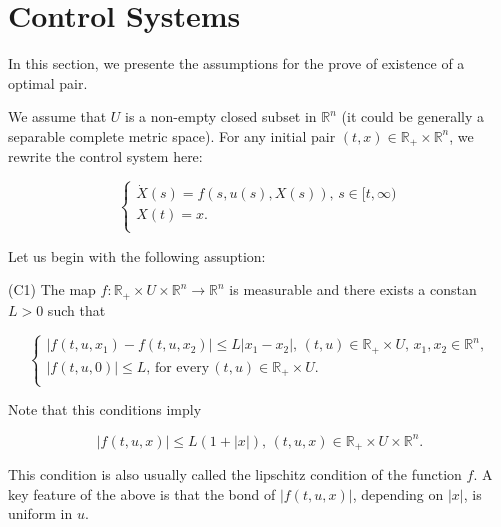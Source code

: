 \section{Control Systems}

In this section, we presente the assumptions for the prove of existence of a 
optimal pair.

We assume that $U$ is a non-empty closed subset in $\mathbb{R}^n$ (it could be 
generally a separable complete metric space). For any initial pair $(t,x)\in 
\mathbb{R}_{+}\times\mathbb{R}^n$, we rewrite the control system here:

\begin{equation}\label{eq2.1}
	\left\{ \begin{array}{l}
	\dot{X}(s)=f(s,u(s),X(s)),\, s\in [t,\infty) \\
	X(t)=x.\\
	\end{array}
	\right.
\end{equation}

Let us begin with the following assuption:

(C1) The map $f:\mathbb{R}_{+}\times U\times \mathbb{R}^n\rightarrow 
\mathbb{R}^n$ is measurable and there exists a constan $L>0$ such that

$$\left\{ \begin{array}{l}
	|f(t,u,x_1)-f(t,u,x_2)|\leq L|x_1-x_2|,\, (t,u)\in \mathbb{R}_{+}\times 
	U,\, x_1,x_2\in \mathbb{R}^n,\\
	|f(t,u,0)|\leq L,\,\mbox{for every}\,(t,u)\in \mathbb{R}_{+}\times U .\\
\end{array}
\right.$$

Note that this conditions imply

$$|f(t,u,x)|\leq L(1+|x|),\,(t,u,x)\in\mathbb{R}_{+}\times U\times 
\mathbb{R}^n.$$

This condition is also usually called the lipschitz condition of the function 
$f$. A key feature of the above is that the bond of $|f(t,u,x)|$, depending on 
$|x|$, is uniform in $u$.


